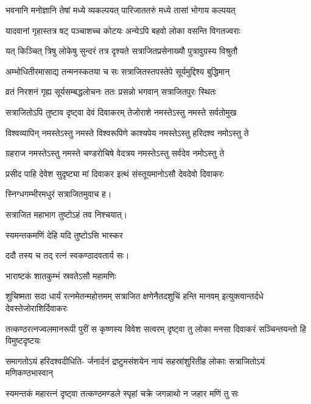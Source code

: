 \begin{center}
\twolineshloka
{भवनानि मनोज्ञानि तेषां मध्ये व्यकल्पयत्}
{पारिजाततरुं मध्ये तासां भोगाय कल्पयत्}%

\twolineshloka
{यादवानां गृहास्तत्र षट् पञ्चाशच्च कोटयः}
{अन्येऽपि बहवो लोका वसन्ति विगतज्वराः}%

\twolineshloka
{यत् किञ्चित् त्रिषु लोकेषु सुन्दरं तत्र दृश्यते}
{सत्राजितप्रसेनाख्यौ पुत्रावुग्रस्य विश्रुतौ}%

\twolineshloka
{अम्भोधितीरमासाद्य तन्मनस्कतया च सः}
{सत्राजितस्तपस्तेपे सूर्यमुद्दिश्य बुद्धिमान्}%

\twolineshloka
{व्रतं निरशनं गृह्य सूर्यसम्बद्धलोचनः}
{ततः प्रसन्नो भगवान् सत्राजितपुरः स्थितः}%

\twolineshloka
{सत्राजितोऽपि तुष्टाव दृष्ट्वा देवं दिवाकरम्}
{तेजोराशे नमस्तेऽस्तु नमस्ते सर्वतोमुख}%

\twolineshloka
{विश्वव्यापिन् नमस्तेऽस्तु नमस्ते विश्वरूपिणे}
{काश्यपेय नमस्तेऽस्तु हरिदश्व नमोऽस्तु ते}%

\twolineshloka
{ग्रहराज नमस्तेऽस्तु नमस्ते चण्डरोचिषे}
{वेदत्रय नमस्तेऽस्तु सर्वदेव नमोऽस्तु ते}%

\twolineshloka
{प्रसीद पाहि देवेश सुदृष्ट्या मां दिवाकर}
{इत्थं संस्तूयमानोऽसौ देवदेवो दिवाकरः}%

{स्निग्धगम्भीरमधुरं सत्राजितमुवाच ह।}



{सत्राजित महाभाग तुष्टोऽहं तव निश्चयात्।}


\onelineshloka
{स्यमन्तकमणिं देहि यदि तुष्टोऽसि भास्कर}%

{ददौ तस्य च तद् रत्नं स्वकण्ठादवतार्य सः।}

\onelineshloka
{भाराष्टकं शातकुम्भं स्रवतेऽसौ महामणिः}%

\threelineshloka
{शुचिष्मता सदा धार्यं रत्नमेतन्महोत्तमम्}
{सत्राजित क्षणेनैतदशुचिं हन्ति मानवम्}
{इत्युक्त्वान्तर्दधे देवस्तेजोराशिर्दिवाकरः}%

\fourlineindentedshloka
{तत्कण्ठरत्नज्वलमानरूपी}
{पुरीं स कृष्णस्य विवेश सत्वरम्} 
{दृष्ट्वा तु लोका मनसा दिवाकरं}
{सञ्चिन्तयन्तो हि विमुष्टदृष्टयः}%

\fourlineindentedshloka
{समागतोऽयं हरिदश्वदीधिति-}
{र्जनार्दनं द्रष्टुमसंशयेन} 
{नायं सहस्रांशुरितीह लोकाः}
{सत्राजितोऽयं मणिकण्ठभास्वान्}%

\twolineshloka
{स्यमन्तकं महारत्नं दृष्ट्वा तत्कण्ठमण्डले}
{स्पृहां चक्रे जगन्नाथो न जहार मणिं तु सः}%


\end{center}
